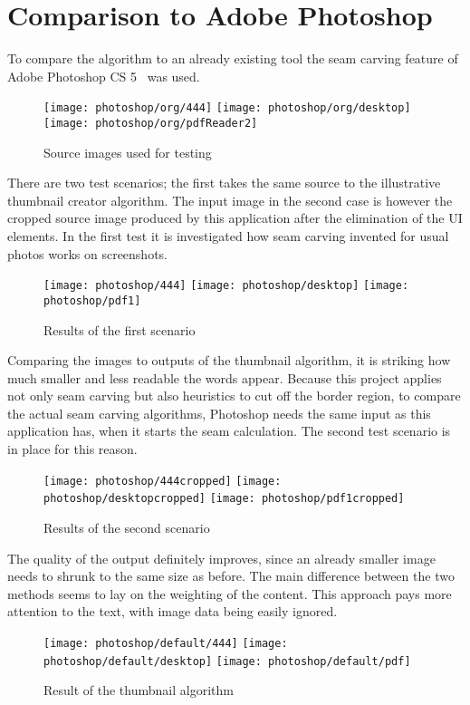 \documentclass[draft,final]{vutinfth} %
\begin{document}
	\section{Comparison to Adobe Photoshop} 
	To compare the algorithm to an already existing tool the seam carving feature of Adobe Photoshop CS 5~\cite{photoshop} was used.
	\begin{figure}[H]
		\texttt{[image: photoshop/org/444]}\hfill
		\texttt{[image: photoshop/org/desktop]}\hfill
		\texttt{[image: photoshop/org/pdfReader2]}
		\caption{Source images used for testing}
	\end{figure}
	There are two test scenarios; the first takes the same source to the illustrative thumbnail creator algorithm.
	The input image in the second case is however the cropped source image produced by this application after the elimination of the UI elements.
	In the first test it is investigated how seam carving invented for usual photos works on screenshots.
	\begin{figure}[H]
		\texttt{[image: photoshop/444]}\hfill
		\texttt{[image: photoshop/desktop]}\hfill
		\texttt{[image: photoshop/pdf1]}
		\caption{Results of the first scenario}
	\end{figure}
	Comparing  the images to outputs of the thumbnail algorithm, it is striking how much smaller and less readable the words appear.
	Because this project applies not only seam carving but also heuristics to cut off the border region, to compare the actual seam carving algorithms, Photoshop  needs the same input as this application has, when it starts the seam calculation.
	The second test scenario is in place for this reason.
	\begin{figure}[H]
		\texttt{[image: photoshop/444cropped]}\hfill
		\texttt{[image: photoshop/desktopcropped]}\hfill
		\texttt{[image: photoshop/pdf1cropped]}
		\caption{Results of the second scenario}
	\end{figure}
	The quality of the  output definitely improves, since an already smaller image needs to shrunk to the same size as before.
	The main difference between the two methods seems to lay on the weighting of the content.
	This approach pays more attention to the text, with image data being easily ignored.
	\begin{figure}[H]
		\texttt{[image: photoshop/default/444]}\hfill
		\texttt{[image: photoshop/default/desktop]}\hfill
		\texttt{[image: photoshop/default/pdf]}
		\caption{Result of the thumbnail algorithm}
	\end{figure}
\end{document}
